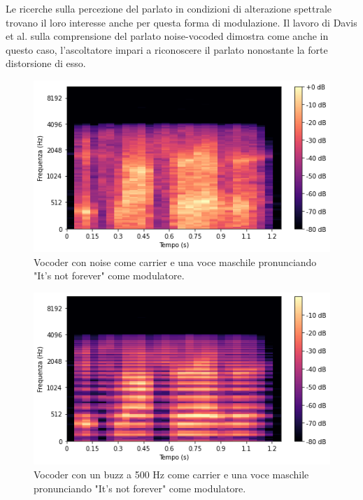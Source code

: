 		Le ricerche sulla percezione del parlato in condizioni di alterazione spettrale trovano il loro interesse anche per questa forma di modulazione. Il lavoro di Davis et al. sulla comprensione del parlato noise-vocoded dimostra come anche in questo caso, l'ascoltatore impari a riconoscere il parlato nonostante la forte distorsione di esso\cite{noise-vocoded}.
		\begin{figure}%
			\centering
			\includegraphics[width=0.75\linewidth]{figures/noise-vocoded}
			\caption{Vocoder con noise come carrier e una voce maschile pronunciando "It's not forever" come modulatore.}
			\label{fig:noise-vocoded}
		\end{figure}
		\begin{figure}%
			\centering
			\includegraphics[width=0.75\linewidth]{figures/buzz-vocoded}
			\caption{Vocoder con un buzz a 500 Hz come carrier e una voce maschile pronunciando "It's not forever" come modulatore.}
			\label{fig:buzz-vocoded}
		\end{figure}
	